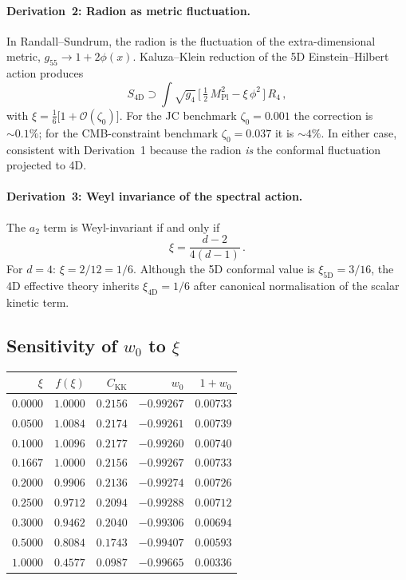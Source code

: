 \paragraph{Derivation~2: Radion as metric fluctuation.}
In Randall--Sundrum, the radion is the fluctuation of the extra-dimensional metric, $g_{55} \to 1 + 2\phi(x)$. Kaluza--Klein reduction of the 5D Einstein--Hilbert action produces
\begin{equation}
  S_{4\mathrm{D}} \supset \int\!\sqrt{g_4}\,\bigl[\,\tfrac{1}{2}\,M_{\mathrm{Pl}}^2 - \xi\,\phi^2\,\bigr]\,R_4\,,
\end{equation}
with $\xi = \frac{1}{6}\bigl[1 + \mathcal{O}(\zeta_0)\bigr]$. For the JC benchmark $\zeta_0 = 0.001$ the correction is $\sim\!0.1\%$; for the CMB-constraint benchmark $\zeta_0 = 0.037$ it is $\sim\!4\%$. In either case, consistent with Derivation~1 because the radion \emph{is} the conformal fluctuation projected to 4D.

\paragraph{Derivation~3: Weyl invariance of the spectral action.}
The $a_2$ term is Weyl-invariant if and only if
\begin{equation}
  \xi = \frac{d-2}{4(d-1)}\,.
  \label{eq:xi-weyl}
\end{equation}
For $d = 4$: $\xi = 2/12 = 1/6$. Although the 5D conformal value is $\xi_{5\mathrm{D}} = 3/16$, the 4D effective theory inherits $\xi_{4\mathrm{D}} = 1/6$ after canonical normalisation of the scalar kinetic term.

\subsection{Sensitivity of $w_0$ to $\xi$}

\begin{center}
\begin{tabular}{r r r r r}
\hline
$\xi$ & $f(\xi)$ & $C_{\mathrm{KK}}$ & $w_0$ & $1 + w_0$ \\
\hline
$0.0000$ & $1.0000$ & $0.2156$ & $-0.99267$ & $0.00733$ \\
$0.0500$ & $1.0084$ & $0.2174$ & $-0.99261$ & $0.00739$ \\
$0.1000$ & $1.0096$ & $0.2177$ & $-0.99260$ & $0.00740$ \\
$0.1667$ & $1.0000$ & $0.2156$ & $-0.99267$ & $0.00733$ \\
$0.2000$ & $0.9906$ & $0.2136$ & $-0.99274$ & $0.00726$ \\
$0.2500$ & $0.9712$ & $0.2094$ & $-0.99288$ & $0.00712$ \\
$0.3000$ & $0.9462$ & $0.2040$ & $-0.99306$ & $0.00694$ \\
$0.5000$ & $0.8084$ & $0.1743$ & $-0.99407$ & $0.00593$ \\
$1.0000$ & $0.4577$ & $0.0987$ & $-0.99665$ & $0.00336$ \\
\hline
\end{tabular}
\end{center}

